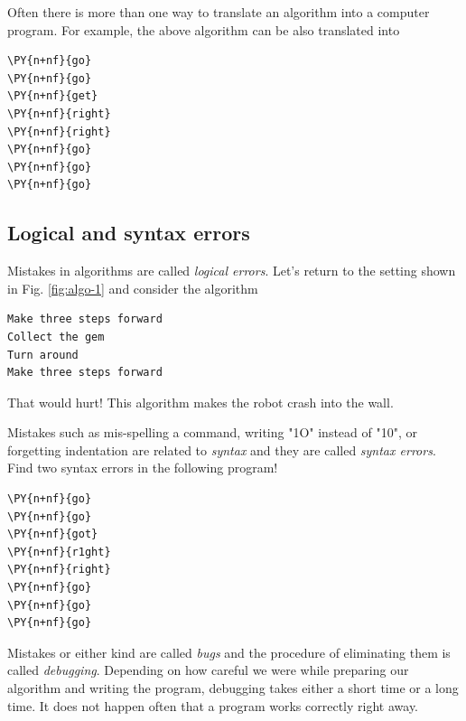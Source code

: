 \noindent
Often there is more than one way to translate an algorithm into a computer 
program. For example, the above algorithm can be also translated into\\

\begin{bbox}
\begin{Verbatim}[commandchars=\\\{\}]
\PY{n+nf}{go}
\PY{n+nf}{go}
\PY{n+nf}{get}
\PY{n+nf}{right}
\PY{n+nf}{right}
\PY{n+nf}{go}
\PY{n+nf}{go}
\PY{n+nf}{go}
\end{Verbatim}
\end{bbox}

\subsection{Logical and syntax errors}

Mistakes in algorithms are called {\em logical errors}. Let's return to 
the setting shown in Fig. \ref{fig:algo-1} and consider the algorithm

\begin{verbatim}
Make three steps forward
Collect the gem
Turn around
Make three steps forward
\end{verbatim}
That would hurt! This algorithm makes the robot crash into the wall. 

Mistakes such as mis-spelling a command, writing "1O" instead of "10", or forgetting 
indentation are related to {\em syntax} and they are called {\em syntax errors}. Find
two syntax errors in the following program!\\

\begin{bbox}
\begin{Verbatim}[commandchars=\\\{\}]
\PY{n+nf}{go}
\PY{n+nf}{go}
\PY{n+nf}{got}
\PY{n+nf}{r1ght}
\PY{n+nf}{right}
\PY{n+nf}{go}
\PY{n+nf}{go}
\PY{n+nf}{go}
\end{Verbatim}
\end{bbox}
\vspace{6mm}

\noindent
Mistakes or either kind are called {\em bugs} and the procedure of 
eliminating them is called {\em debugging}. Depending on how careful we 
were while preparing our algorithm and writing the program, debugging takes either 
a short time or a long time. It does not happen often that a program works correctly
right away. \\

